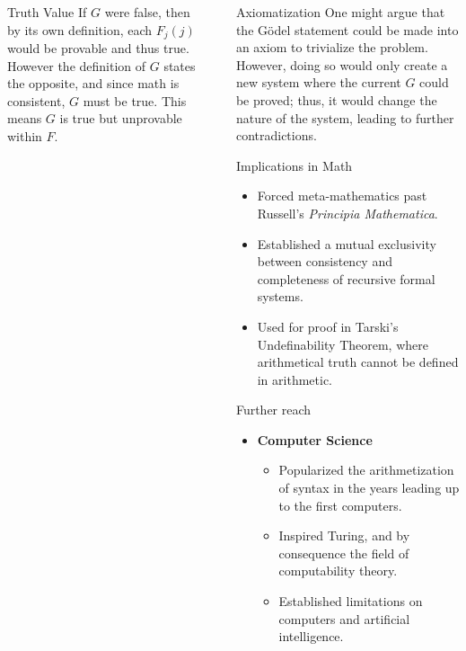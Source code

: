 \documentclass[final]{beamer}
\newlength{\sepwidth}
\newlength{\colwidth}
\newcommand{\separatorcolumn}{\begin{column}{\sepwidth}\end{column}}
\begin{document}
\begin{frame}[t]
\begin{columns}[t]
\begin{column}{\colwidth}
 \begin{block}{Truth Value}
If $G$ were false, then by its own definition, each $F_j(j)$ would be provable and thus true. However the definition of $G$ states the opposite, and since math is consistent, $G$ must be true. This means $G$ is true but unprovable within $F$.
 
 \end{block}

\end{column}


\separatorcolumn

\begin{column}{\colwidth}

\begin{block}{Axiomatization}
One might argue that the Gödel statement could be made into an axiom to trivialize the problem. However, doing so would only create a new system where the current $G$ could be proved; thus, it would change the nature of the system, leading to further contradictions.

\end{block}

\begin{block}{Implications in Math}

        \begin{itemize}
        
            \item Forced meta-mathematics past Russell's \textit{Principia Mathematica}.
            \item Established a mutual exclusivity between consistency and completeness of recursive formal systems.
            \item Used for proof in Tarski's Undefinability Theorem, where arithmetical truth cannot be defined in arithmetic.
            
        \end{itemize}
\end{block}


\begin{block}{Further reach}
    \begin{itemize}
      \item \textbf{Computer Science}
        \begin{itemize}

            \item Popularized the arithmetization of syntax in the years leading up to the first computers.
            \item Inspired Turing, and by consequence the field of computability theory.
            \item Established limitations on computers and artificial intelligence.
            

\end{itemize}
\end{itemize}
\end{block}
\end{column}
\end{columns}
\end{frame}
\end{document}
